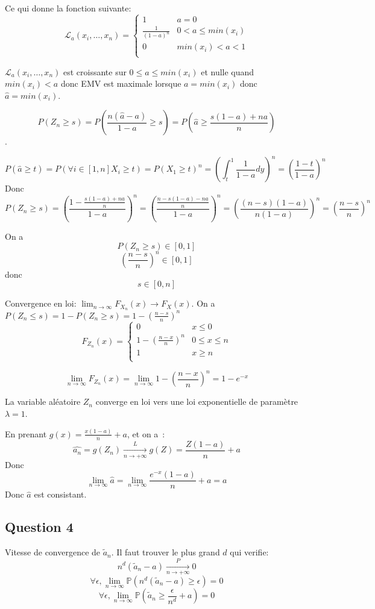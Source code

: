\documentclass[]{book}
\theoremstyle{definition}
\begin{document}
Ce qui donne la fonction suivante:
$$
\mathcal{L}_a(x_i,\ldots,x_n) =     
\left\{
    \begin{array}{cc}
        1 &  a = 0 \\
        \frac{1}{(1-a)^n} & 0 < a \leq min(x_i)\\
        0 & min(x_i) < a < 1 \\
    \end{array}
\right.
$$ 

$\mathcal{L}_a(x_i,\ldots,x_n)$ est croissante sur $0 \leq a \leq min(x_i)$ et nulle quand $min(x_i) < a$ donc EMV est maximale lorsque $a=min(x_i)$ donc $\hat{a}=min(x_i)$.  


$$
P(Z_{n} \geq s) = P\left(\frac{n(\hat{a}-a)}{1-a} \geq s\right) = P\left(\hat{a} \geq \frac{s(1-a)+na}{n}\right) 
$$.


$$
P(\hat{a} \geq t) = P(\forall i \in [1,n] X_i \geq t) = P(X_1 \geq t)^n = \left(\int_{t}^{1}{\frac{1}{1-a}dy}\right)^n = \left(\frac{1-t}{1-a}\right)^n
$$
Donc
$$
P(Z_{n} \geq s) = \left(\frac{1-\frac{s(1-a)+na}{n}}{1-a}\right)^n = \left(\frac{\frac{n-s(1-a)-na}{n}}{1-a}\right)^n = \left(\frac{(n-s)(1-a)}{n(1-a)}\right)^n = \left(\frac{n-s}{n}\right)^n
$$

On a 
$$
P(Z_{n} \geq s) \in [0,1]
$$
$$
\left(\frac{n-s}{n}\right)^n \in [0,1]
$$
donc
$$
s \in [0,n]
$$

Convergence en loi: $\lim_{n \to \infty} F_{X_n}(x) \to F_X(x)$.
On a $P(Z_{n} \leq s) = 1 - P(Z_{n} \geq s) = 1 - \left(\frac{n-s}{n}\right)^n$
$$
F_{Z_n}(x) =     
\left\{
    \begin{array}{cc}
        0 &  x \leq 0 \\
        1 - \left(\frac{n-x}{n}\right)^n & 0 \leq x \leq n\\
        1 & x \geq n \\
    \end{array}
\right.
$$ 


$$
\lim_{n \to \infty} F_{Z_n}(x) = \lim_{n \to \infty} 1- \left(\frac{n-x}{n}\right)^n = 1 - e^{-x}
$$

La variable al\'eatoire $Z_n$ converge en loi vers une loi exponentielle de param\`etre $\lambda = 1$. 

En prenant $g(x) = \frac{x(1-a)}{n}+a$, et on a~:  
$$
\hat{a_n} = g(Z_n) \xrightarrow[n \to +\infty]{L} g(Z) = \frac{Z(1-a)}{n} + a
$$
Donc
$$
\lim_{n \to \infty}\hat{a} = \lim_{n \to \infty}\frac{e^{-x}(1-a)}{n} + a = a
$$
Donc $\hat{a}$ est consistant.

\subsection*{Question 4}
Vitesse de convergence de $\tilde{a}_n$.
Il faut trouver le plus grand $d$ qui verifie:
$$
n^d(\tilde{a}_n-a) \xrightarrow[n \to +\infty]{P} 0
$$
$$
\forall \epsilon, \lim_{n \to \infty}{\mathbb{P}(n^d(\tilde{a}_n-a) \geq \epsilon)} = 0
$$
$$
\forall \epsilon, \lim_{n \to \infty}{\mathbb{P}(\tilde{a}_n \geq \frac{\epsilon}{n^d} + a)} = 0
$$
\end{document}

